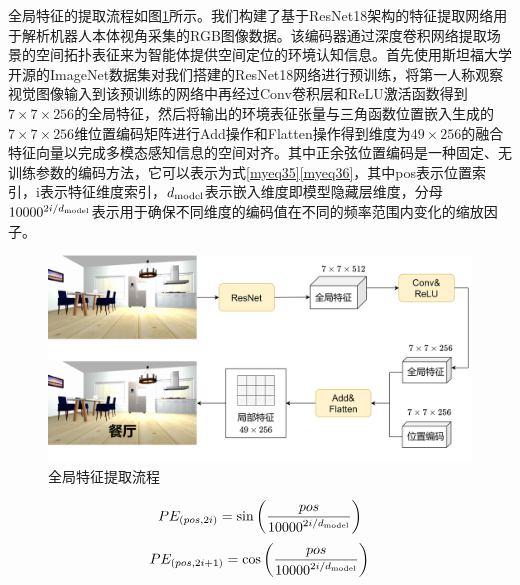 全局特征的提取流程如图\ref{全局特征提取}所示。我们构建了基于ResNet18架构的特征提取网络用于解析机器人本体视角采集的RGB图像数据。该编码器通过深度卷积网络提取场景的空间拓扑表征来为智能体提供空间定位的环境认知信息。首先使用斯坦福大学开源的ImageNet数据集对我们搭建的ResNet18网络进行预训练，将第一人称观察视觉图像输入到该预训练的网络中再经过Conv卷积层和ReLU激活函数得到$7 \times 7 \times 256$的全局特征，然后将输出的环境表征张量与三角函数位置嵌入生成的$7 \times 7 \times 256$维位置编码矩阵进行Add操作和Flatten操作得到维度为$49 \times 256$的融合特征向量以完成多模态感知信息的空间对齐。其中正余弦位置编码是一种固定、无训练参数的编码方法，它可以表示为式\ref{myeq35}\ref{myeq36}，其中pos表示位置索引，i表示特征维度索引，$d_{{\rm{model}}}$表示嵌入维度即模型隐藏层维度，分母${10000^{{{2i} \mathord{\left/
 {\vphantom {{2i} {{d_{{\rm{model}}}}}}} \right.
 \kern-\nulldelimiterspace} {{d_{{\rm{model}}}}}}}}$表示用于确保不同维度的编码值在不同的频率范围内变化的缩放因子。
\begin{figure}[htbp]
    \centering
    \includegraphics[scale=0.09]{Fig/全局特征提取.png}
    \caption{\label{全局特征提取}全局特征提取流程}
\end{figure}

\begin{equation}
    P{E_{\left( {pos,2i} \right)}} = \sin \left( {\frac{{pos}}{{{{10000}^{{{2i} \mathord{\left/
 {\vphantom {{2i} {{d_{{\rm{model}}}}}}} \right.
 \kern-\nulldelimiterspace} {{d_{{\rm{model}}}}}}}}}}} \right)
    \label{myeq35}
\end{equation}
\begin{equation}
    P{E_{\left( {pos,2i + 1} \right)}} = \cos \left( {\frac{{pos}}{{{{10000}^{{{2i} \mathord{\left/
 {\vphantom {{2i} {{d_{{\rm{model}}}}}}} \right.
 \kern-\nulldelimiterspace} {{d_{{\rm{model}}}}}}}}}}} \right)
    \label{myeq36}
\end{equation}

